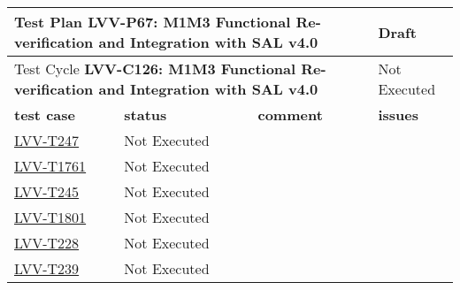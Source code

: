 \documentclass[SE,lsstdraft,STR,toc]{lsstdoc}
\begin{document}
\begin{longtable}{p{2cm}p{2.5cm}p{9cm}p{2.5cm}}
\toprule
\multicolumn{3}{p{13.5cm}}{ Test Plan {\bf LVV-P67: M1M3 Functional Re-verification and Integration with SAL v4.0 }} & Draft \\\hline

  \multicolumn{3}{p{13.5cm}}{ Test Cycle {\bf LVV-C126: M1M3 Functional Re-verification and Integration with SAL v4.0 }} & Not Executed \\\hline

  {\bf \footnotesize test case} & {\bf \footnotesize status} & {\bf \footnotesize comment} & {\bf \footnotesize issues} \\\toprule

    \href{https://jira.lsstcorp.org/secure/Tests.jspa#/testCase/LVV-T247}{LVV-T247}
    & Not Executed &
    \begin{minipage}[]{9cm}
    \smallskip
    
    \medskip
    \end{minipage}
    &
    \\\hline
    \href{https://jira.lsstcorp.org/secure/Tests.jspa#/testCase/LVV-T1761}{LVV-T1761}
    & Not Executed &
    \begin{minipage}[]{9cm}
    \smallskip
    
    \medskip
    \end{minipage}
    &
    \\\hline
    \href{https://jira.lsstcorp.org/secure/Tests.jspa#/testCase/LVV-T245}{LVV-T245}
    & Not Executed &
    \begin{minipage}[]{9cm}
    \smallskip
    
    \medskip
    \end{minipage}
    &
    \\\hline
    \href{https://jira.lsstcorp.org/secure/Tests.jspa#/testCase/LVV-T1801}{LVV-T1801}
    & Not Executed &
    \begin{minipage}[]{9cm}
    \smallskip
    
    \medskip
    \end{minipage}
    &
    \\\hline
    \href{https://jira.lsstcorp.org/secure/Tests.jspa#/testCase/LVV-T228}{LVV-T228}
    & Not Executed &
    \begin{minipage}[]{9cm}
    \smallskip
    
    \medskip
    \end{minipage}
    &
    \\\hline
    \href{https://jira.lsstcorp.org/secure/Tests.jspa#/testCase/LVV-T239}{LVV-T239}
    & Not Executed &
    \begin{minipage}[]{9cm}
    \smallskip
    

\end{minipage}
\end{longtable}
\end{document}
